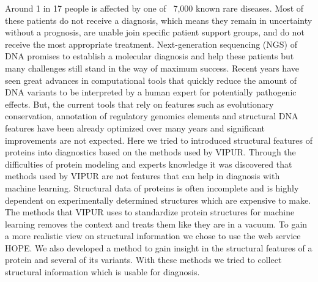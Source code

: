 Around 1 in 17 people is affected by one of ~7,000 known rare diseases. Most of these patients do not receive a diagnosis, which means they remain in uncertainty without a prognosis, are unable join specific patient support groups, and do not receive the most appropriate treatment.
Next-generation sequencing (NGS) of DNA promises to establish a molecular diagnosis and help these patients but many challenges still stand in the way of maximum success.
Recent years have seen great advances in computational tools that quickly reduce the amount of DNA variants to be interpreted by a human expert for potentially pathogenic effects.
But, the current tools that rely on features such as evolutionary conservation, annotation of regulatory genomics elements and structural DNA features have been already optimized over many years and significant improvements are not expected. 
Here we tried to introduced structural features of proteins into diagnostics based on the methods used by VIPUR. Through the difficulties of protein modeling and experts knowledge it was discovered that methods used by VIPUR are not features that can help in diagnosis with machine learning. Structural data of proteins is often incomplete and is highly dependent on experimentally determined structures which are expensive to make. The methods that VIPUR uses to standardize protein structures for machine learning removes the context and treats them like they are in a vacuum. To gain a more realistic view on structural information we chose to use the web service HOPE. We also developed a method to gain insight in the structural features of a protein and several of its variants. With these methods we tried to collect structural information which is usable for diagnosis.